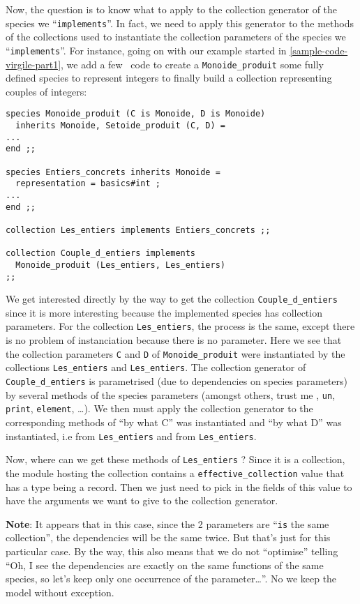 Now, the question is to know what to apply to the collection generator
of the species we ``{\tt implements}''. In fact, we need to apply this
generator to the methods of the collections used to instantiate the
collection parameters of the species we ``{\tt implements}''.
For instance, going on with our example started in
\ref{sample-code-virgile-part1}, we add a few \focalize\ code to
create a {\tt Monoide\_produit} some fully defined species to
represent integers to finally build a collection representing couples
of integers:
{\footnotesize
\begin{lstlisting}
species Monoide_produit (C is Monoide, D is Monoide)
  inherits Monoide, Setoide_produit (C, D) =
...
end ;;

species Entiers_concrets inherits Monoide =
  representation = basics#int ;
...
end ;;

collection Les_entiers implements Entiers_concrets ;;

collection Couple_d_entiers implements
  Monoide_produit (Les_entiers, Les_entiers)
;;
\end{lstlisting}
}
We get interested directly by the way to get the collection
{\tt Couple\_d\_entiers} since it is more interesting because the
implemented species has collection parameters. For the collection
{\tt Les\_entiers}, the process is the same, except there is no
problem of instanciation because there is no parameter.
Here we see that the collection parameters {\tt C} and {\tt D} of
{\tt Monoide\_produit} were instantiated by the collections
{\tt Les\_entiers} and {\tt Les\_entiers}. The collection generator of
{\tt Couple\_d\_entiers} is parametrised (due to dependencies on
species parameters) by several methods of the species parameters
(amongst others, trust me \smiley, {\tt un}, {\tt print},
{\tt element}, \ldots).
We then must apply the collection generator to the corresponding
methods of ``by what C'' was instantiated and ``by what D'' was
instantiated, i.e from {\tt Les\_entiers} and from
{\tt Les\_entiers}.

Now, where can we get these methods of {\tt Les\_entiers} ? Since it is
a collection, the module hosting the collection contains a
{\tt effective\_collection} value that has a type being a record. Then
we just need to pick in the fields of this value to have the arguments
we want to give to the collection generator.

\medskip
{\bf Note}: It appears that in this case, since the 2
parameters are ``{\tt is} the same collection'', the dependencies will
be the same twice. But that's just for this particular case. By the
way, this also means that we do not ``optimise'' telling ``Oh, I see
the dependencies are exactly on the same functions of the same species,
so let's keep only one occurrence of the parameter\ldots''. No we keep
the model without exception.

